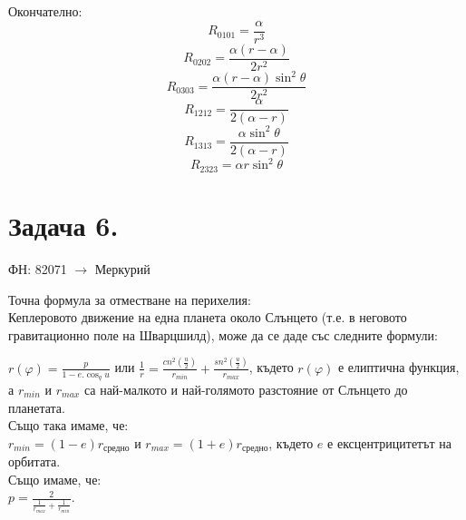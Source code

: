 \documentclass[a4paper,12pt]{article}
\begin{document}
    Окончателно: 
    \begin{equation*}
        R_{0101} = \frac{\alpha}{r^3} 
    \end{equation*}
    \begin{equation*}
        R_{0202} = \frac{\alpha(r-\alpha)}{2r^2} 
    \end{equation*}
    \begin{equation*}
        R_{0303} = \frac{\alpha(r-\alpha)\sin^2\theta}{2r^2} 
    \end{equation*}
    \begin{equation*}
        R_{1212} = \frac{\alpha}{2(\alpha-r)} 
    \end{equation*}
    \begin{equation*}
        R_{1313} = \frac{\alpha\sin^2\theta}{2(\alpha-r)} 
    \end{equation*}
    \begin{equation*}
        R_{2323} = \alpha r\sin^2\theta
    \end{equation*}

    \pagebreak
    \section*{Задача 6.}
    ФН: 82071 $\rightarrow$ Меркурий

    Точна формула за отместване на перихелия: \\
    Кеплеровото движение на една планета около Слънцето (т.е. в неговото гравитационно поле на Шварцшилд), може да се даде със следните 
    формули:

    $
        r(\varphi) = \frac{p}{1-e.\cos_q u}
    $
    или 
    $
        \frac{1}{r} = \frac{cn^2(\frac{u}{2})}{r_{min}} + \frac{sn^2(\frac{u}{2})}{r_{max}}
    $, 
    където $r(\varphi)$ е елиптична функция, а $r_{min}$ и $r_{max}$ са най-малкото и най-голямото
    разстояние от Слънцето до планетата. \\ Също така имаме, че: \\
    $
        r_{min} = (1-e)r_{\text{средно}}
    $ и 
    $
        r_{max}=(1+e)r_{\text{средно}}
    $, където $e$ е ексцентрицитетът на орбитата.
    \\ Също имаме, че: \\
    $p = \frac{2}{\frac{1}{r_{max}} + \frac{1}{r_{min}}}$.
\end{document}
